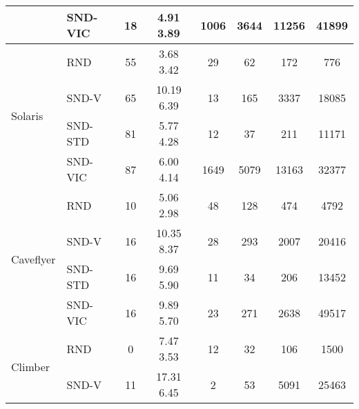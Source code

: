 \documentclass[a4paper,11pt]{elsarticle}
\begin{document}
\begin{table}[t!]
\begin{tabular}{l|l|cccccc}
& \multicolumn{1}{l|}{SND-VIC} & \multicolumn{1}{c}{18} & \multicolumn{1}{c}{4.91  3.89} & \multicolumn{1}{c}{1006} & \multicolumn{1}{c}{3644} & \multicolumn{1}{c}{11256} & \multicolumn{1}{c}{41899} \\
\hline \multirow{4}{*}{Solaris}
& \multicolumn{1}{l|}{RND} & \multicolumn{1}{c}{55} & \multicolumn{1}{c}{3.68  3.42} & \multicolumn{1}{c}{29} & \multicolumn{1}{c}{62} & \multicolumn{1}{c}{172} & \multicolumn{1}{c}{776} \\
& \multicolumn{1}{l|}{SND-V} & \multicolumn{1}{c}{65} & \multicolumn{1}{c}{10.19  6.39} & \multicolumn{1}{c}{13} & \multicolumn{1}{c}{165} & \multicolumn{1}{c}{3337} & \multicolumn{1}{c}{18085} \\
& \multicolumn{1}{l|}{SND-STD} & \multicolumn{1}{c}{81} & \multicolumn{1}{c}{5.77  4.28} & \multicolumn{1}{c}{12} & \multicolumn{1}{c}{37} & \multicolumn{1}{c}{211} & \multicolumn{1}{c}{11171} \\
& \multicolumn{1}{l|}{SND-VIC} & \multicolumn{1}{c}{87} & \multicolumn{1}{c}{6.00  4.14} & \multicolumn{1}{c}{1649} & \multicolumn{1}{c}{5079} & \multicolumn{1}{c}{13163} & \multicolumn{1}{c}{32377} \\
\hline\hline
\multirow{4}{*}{Caveflyer}
& \multicolumn{1}{l|}{RND} & \multicolumn{1}{c}{10} & \multicolumn{1}{c}{5.06  2.98} & \multicolumn{1}{c}{48} & \multicolumn{1}{c}{128} & \multicolumn{1}{c}{474} & \multicolumn{1}{c}{4792} \\
& \multicolumn{1}{l|}{SND-V} & \multicolumn{1}{c}{16} & \multicolumn{1}{c}{10.35  8.37} & \multicolumn{1}{c}{28} & \multicolumn{1}{c}{293} & \multicolumn{1}{c}{2007} & \multicolumn{1}{c}{20416} \\
& \multicolumn{1}{l|}{SND-STD} & \multicolumn{1}{c}{16} & \multicolumn{1}{c}{9.69  5.90} & \multicolumn{1}{c}{11} & \multicolumn{1}{c}{34} & \multicolumn{1}{c}{206} & \multicolumn{1}{c}{13452} \\
& \multicolumn{1}{l|}{SND-VIC} & \multicolumn{1}{c}{16} & \multicolumn{1}{c}{9.89  5.70} & \multicolumn{1}{c}{23} & \multicolumn{1}{c}{271} & \multicolumn{1}{c}{2638} & \multicolumn{1}{c}{49517} \\
\hline \multirow{4}{*}{Climber}
& \multicolumn{1}{l|}{RND} & \multicolumn{1}{c}{0} & \multicolumn{1}{c}{7.47  3.53} & \multicolumn{1}{c}{12} & \multicolumn{1}{c}{32} & \multicolumn{1}{c}{106} & \multicolumn{1}{c}{1500} \\
& \multicolumn{1}{l|}{SND-V} & \multicolumn{1}{c}{11} & \multicolumn{1}{c}{17.31  6.45} & \multicolumn{1}{c}{2} & \multicolumn{1}{c}{53} & \multicolumn{1}{c}{5091} & \multicolumn{1}{c}{25463} \\

\end{tabular}
\end{table}
\end{document}
